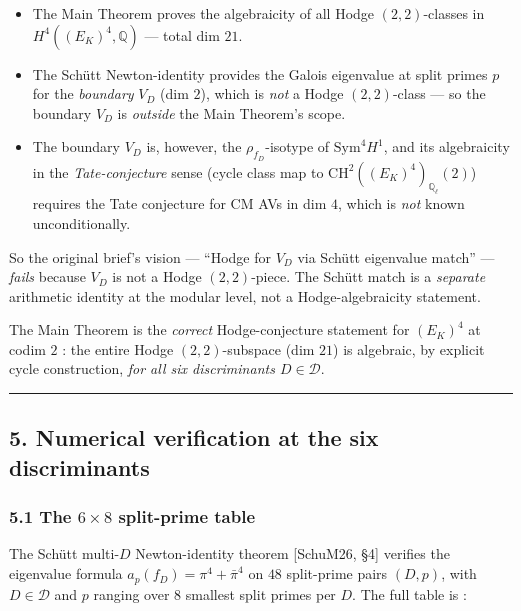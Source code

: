 \documentclass[
  11pt,
  a4paper,
]{amsart}
\providecommand{\tightlist}{\setlength{\itemsep}{0pt}\setlength{\parskip}{0pt}}
\providecommand{\tightlist}{%
  \setlength{\itemsep}{0pt}\setlength{\parskip}{0pt}}
\begin{document}
\begin{itemize}
\tightlist
\item
  The Main Theorem proves the algebraicity of all Hodge \((2,2)\)-classes in \(H^4((E_K)^4, \mathbb{Q})\) --- total dim \(21\).
\item
  The Schütt Newton-identity provides the Galois eigenvalue at split primes \(p\) for the \emph{boundary} \(V_D\) (dim \(2\)), which is \emph{not} a Hodge \((2,2)\)-class --- so the boundary \(V_D\) is \emph{outside} the Main Theorem's scope.
\item
  The boundary \(V_D\) is, however, the \(\rho_{f_D}\)-isotype of \(\mathrm{Sym}^4 H^1\), and its algebraicity in the \emph{Tate-conjecture} sense (cycle class map to \(\mathrm{CH}^2((E_K)^4)_{\mathbb{Q}_\ell}(2)\)) requires the Tate conjecture for CM AVs in dim \(4\), which is \emph{not} known unconditionally.
\end{itemize}

So the original brief's vision --- ``Hodge for \(V_D\) via Schütt eigenvalue match'' --- \emph{fails} because \(V_D\) is not a Hodge \((2,2)\)-piece. The Schütt match is a \emph{separate} arithmetic identity at the modular level, not a Hodge-algebraicity statement.

The Main Theorem is the \emph{correct} Hodge-conjecture statement for \((E_K)^4\) at codim \(2\) : the entire Hodge \((2,2)\)-subspace (dim \(21\)) is algebraic, by explicit cycle construction, \emph{for all six discriminants \(D \in \mathcal{D}\)}.

\begin{center}\rule{0.5\linewidth}{0.5pt}\end{center}

\hypertarget{numerical-verification-at-the-six-discriminants}{%
\subsection{5. Numerical verification at the six discriminants}\label{numerical-verification-at-the-six-discriminants}}

\hypertarget{the-6-times-8-split-prime-table}{%
\subsubsection{\texorpdfstring{5.1 The \(6 \times 8\) split-prime table}{5.1 The 6 \textbackslash times 8 split-prime table}}\label{the-6-times-8-split-prime-table}}

The Schütt multi-\(D\) Newton-identity theorem {[}SchuM26, §4{]} verifies the eigenvalue formula \(a_p(f_D) = \pi^4 + \bar\pi^4\) on \(48\) split-prime pairs \((D, p)\), with \(D \in \mathcal{D}\) and \(p\) ranging over \(8\) smallest split primes per \(D\). The full table is :
\end{document}
